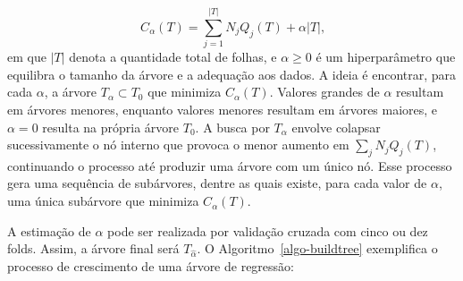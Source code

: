 \documentclass[
  12pt,
  a4paper,
]{scrreprt}
\begin{document}
\[
C_{\alpha}\left(T\right) = \sum_{j = 1}^{|T|}N_jQ_j\left(T\right) + \alpha |T|\text{,}
\] em que \(|T|\) denota a quantidade total de folhas, e
\(\alpha \geq 0\) é um hiperparâmetro que equilibra o tamanho da árvore
e a adequação aos dados. A ideia é encontrar, para cada \(\alpha\), a
árvore \(T_{\alpha} \subset T_0\) que minimiza
\(C_{\alpha}\left(T\right)\). Valores grandes de \(\alpha\) resultam em
árvores menores, enquanto valores menores resultam em árvores maiores, e
\(\alpha = 0\) resulta na própria árvore \(T_0\). A busca por
\(T_{\alpha}\) envolve colapsar sucessivamente o nó interno que provoca
o menor aumento em \(\sum_j N_j Q_j\left(T\right)\), continuando o
processo até produzir uma árvore com um único nó. Esse processo gera uma
sequência de subárvores, dentre as quais existe, para cada valor de
\(\alpha\), uma única subárvore que minimiza
\(C_{\alpha}\left(T\right)\).

\vspace{12pt}

A estimação de \(\alpha\) pode ser realizada por validação cruzada com
cinco ou dez folds. Assim, a árvore final será \(T_{\hat \alpha}\). O
 Algoritmo~\ref{algo-buildtree}  exemplifica o processo de crescimento
de uma árvore de regressão:
\end{document}
